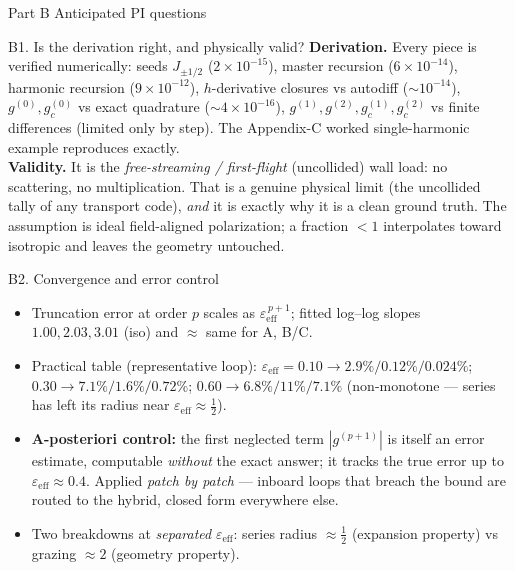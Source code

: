 \documentclass[aspectratio=169]{beamer}
\newcommand{\eps}{\varepsilon}
\newcommand{\Ja}[1]{J_{#1}}
\begin{document}
\begin{frame}[t]{Part B}
  \centering\vfill{\Huge Anticipated PI questions}\vfill
\end{frame}

\begin{frame}{B1. Is the derivation right, and physically valid?}
  \small
  \textbf{Derivation.} Every piece is verified numerically: seeds $\Ja{\pm1/2}$ ($2\times10^{-15}$),
  master recursion ($6\times10^{-14}$), harmonic recursion ($9\times10^{-12}$), $h$-derivative
  closures vs autodiff ($\sim10^{-14}$), $g^{(0)},g_c^{(0)}$ vs exact quadrature ($\sim4\times10^{-16}$),
  $g^{(1)},g^{(2)},g_c^{(1)},g_c^{(2)}$ vs finite differences (limited only by step). The Appendix-C
  worked single-harmonic example reproduces exactly.\\[0.4em]
  \textbf{Validity.} It is the \emph{free-streaming / first-flight} (uncollided) wall load: no
  scattering, no multiplication. That is a genuine physical limit (the uncollided tally of any
  transport code), \emph{and} it is exactly why it is a clean ground truth. The assumption is ideal
  field-aligned polarization; a fraction $<1$ interpolates toward isotropic and leaves the geometry
  untouched.
\end{frame}

\begin{frame}{B2. Convergence and error control}
  \small
  \begin{itemize}
    \item Truncation error at order $p$ scales as $\eps_{\mathrm{eff}}^{\,p+1}$; fitted log--log
      slopes $1.00, 2.03, 3.01$ (iso) and $\approx$ same for A, B/C.
    \item Practical table (representative loop): $\eps_{\mathrm{eff}}=0.10\!\to\!2.9\%/0.12\%/0.024\%$;
      $0.30\!\to\!7.1\%/1.6\%/0.72\%$; $0.60\!\to\!6.8\%/11\%/7.1\%$ (non-monotone --- series has
      left its radius near $\eps_{\mathrm{eff}}\approx\tfrac12$).
    \item \textbf{A-posteriori control:} the first neglected term $|g^{(p+1)}|$ is itself an error
      estimate, computable \emph{without} the exact answer; it tracks the true error up to
      $\eps_{\mathrm{eff}}\approx0.4$. Applied \emph{patch by patch} --- inboard loops that breach
      the bound are routed to the hybrid, closed form everywhere else.
    \item Two breakdowns at \emph{separated} $\eps_{\mathrm{eff}}$: series radius $\approx\tfrac12$
      (expansion property) vs grazing $\approx 2$ (geometry property).
  \end{itemize}
\end{frame}
\end{document}
